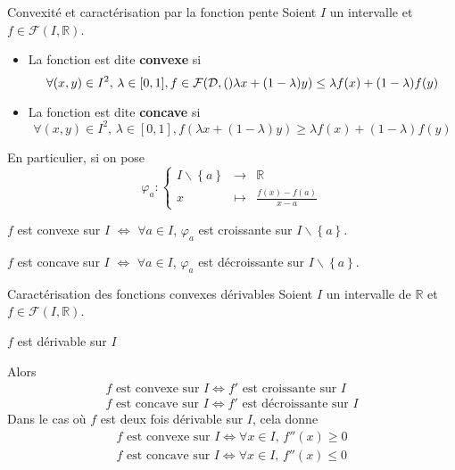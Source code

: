     \begin{defitheo}{Convexité et caractérisation par la fonction pente}{}
        Soient $I$ un intervalle et $f \in \mathcal{F}(I,\mathbb{R})$. 
        \begin{itemize}
            \item La fonction est dite \textbf{convexe} si 
            \[ \forall (x,y) \in I^2, \, \lambda \in [0,1], f \in \mathcal{F}(\mathcal{D},\mathbb{(})\lambda x + (1-\lambda)y) \leq \lambda f(x) + (1- \lambda)f(y) \]
            \item La fonction est dite \textbf{concave} si 
            \[ \forall (x,y) \in I^2, \, \lambda \in [0,1], f(\lambda x + (1-\lambda)y) \geq \lambda f(x) + (1- \lambda)f(y) \]
        \end{itemize}
        En particulier, si on pose 
        \[  \varphi_a : \left\{ \begin{array}{ccl}
            I \backslash \left\{ a \right\} & \rightarrow & \mathbb{R} \\
            x & \mapsto & \frac{f(x)-f(a)}{x-a}
        \end{array} \right. \] 
        \begin{alors}
            \item $f$ est convexe sur $I$ $\iff$ $\forall a \in I$, $\varphi_a$ est croissante sur $I \backslash \left\{ a \right\}$.
            \item $f$ est concave sur $I$ $\iff$ $\forall a \in I$, $\varphi_a$ est décroissante sur $I \backslash \left\{ a \right\}$.
        \end{alors}
    \end{defitheo}

    \begin{theo}{Caractérisation des fonctions convexes dérivables}{}
        Soient $I$ un intervalle de $\mathbb{R}$ et $f \in \mathcal{F}(I,\mathbb{R})$.
        \begin{suppose}
            \item $f$ est dérivable sur $I$
        \end{suppose}
        Alors 
        \[ \begin{array}{l}
            f \text{ est convexe sur } I \iff f' \text{ est croissante sur } I \\
            f \text{ est concave sur } I \iff f' \text{ est décroissante sur } I
        \end{array} \]
        Dans le cas où $f$ est deux fois dérivable sur $I$, cela donne 
        \[ \begin{array}{l}
            f \text{ est convexe sur } I \iff \forall x \in I, \, f''(x) \geq 0 \\
            f \text{ est concave sur } I \iff \forall x \in I, \, f''(x) \leq 0
        \end{array} \]
    \end{theo}

